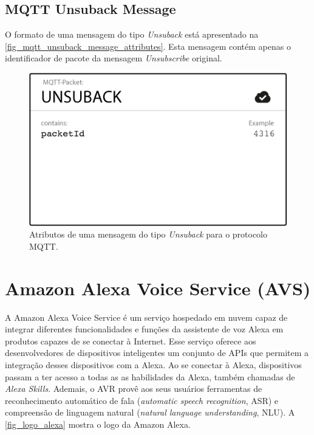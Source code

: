 \documentclass[
    12pt,
    openright,
    twoside,
    a4paper,
    english,
    spanish,
    brazil,
    ]{abntex2}
\begin{document}
\subsection{MQTT Unsuback Message}\label{section_mqtt_unsuback_message}
O formato de uma mensagem do tipo \textit{Unsuback} está apresentado na \autoref{fig_mqtt_unsuback_message_attributes}. Esta mensagem contém apenas o identificador de pacote da mensagem \textit{Unsubscribe} original.
\begin{figure}[htb]
	\begin{center}
		\caption{Atributos de uma mensagem do tipo \textit{Unsuback} para o protocolo MQTT.}\label{fig_mqtt_unsuback_message_attributes}
		\includegraphics[scale=0.5]{Images/mqtt_unsuback_message_attributes.png}
	\end{center}
\end{figure}

\section{Amazon Alexa Voice Service (AVS)}
A Amazon Alexa Voice Service é um serviço hospedado em nuvem capaz de integrar diferentes funcionalidades e funções da assistente de voz Alexa em produtos capazes de se conectar à Internet. Esse serviço oferece aos desenvolvedores de dispositivos inteligentes um conjunto de APIs que permitem a integração desses dispositivos com a Alexa. Ao se conectar à Alexa, dispositivos passam a ter acesso a todas as as habilidades da Alexa, também chamadas de \textit{Alexa Skills}. Ademais, o AVR provê aos seus usuários ferramentas de reconhecimento automático de fala (\textit{automatic speech recognition}, ASR) e compreensão de linguagem natural (\textit{natural language understanding}, NLU). A \autoref{fig_logo_alexa} mostra o logo da Amazon Alexa.
\end{document}
